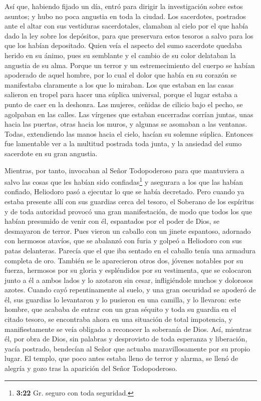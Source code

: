  Así que, habiendo fijado un día, entró para dirigir la
investigación sobre estos asuntos; y hubo no poca angustia en toda la
ciudad.  Los sacerdotes, postrados ante el altar con sus
vestiduras sacerdotales, clamaban al cielo por el que había dado la ley
sobre los depósitos, para que preservara estos tesoros a salvo para los
que los habían depositado.  Quien veía el aspecto del
sumo sacerdote quedaba herido en su ánimo, pues su semblante y el cambio
de su color delataban la angustia de su alma.  Porque un
terror y un estremecimiento del cuerpo se habían apoderado de aquel
hombre, por lo cual el dolor que había en su corazón se manifestaba
claramente a los que lo miraban.  Los que estaban en las
casas salieron en tropel para hacer una súplica universal, porque el
lugar estaba a punto de caer en la deshonra.  Las
mujeres, ceñidas de cilicio bajo el pecho, se agolpaban en las calles.
Las vírgenes que estaban encerradas corrían juntas, unas hacia las
puertas, otras hacia los muros, y algunas se asomaban a las ventanas.
 Todas, extendiendo las manos hacia el cielo, hacían su
solemne súplica.  Entonces fue lamentable ver a la
multitud postrada toda junta, y la ansiedad del sumo sacerdote en su
gran angustia.

 Mientras, por tanto, invocaban al Señor Todopoderoso
para que mantuviera a salvo las cosas que les habían sido
confiadas\footnote{\textbf{3:22} Gr. seguro con toda seguridad.} y
asegurara a los que las habían confiado,  Heliodoro pasó
a ejecutar lo que se había decretado.  Pero cuando ya
estaba presente allí con sus guardias cerca del tesoro, el Soberano de
los espíritus y de toda autoridad provocó una gran manifestación, de
modo que todos los que habían presumido de venir con él, espantados por
el poder de Dios, se desmayaron de terror.  Pues vieron
un caballo con un jinete espantoso, adornado con hermosos atavíos, que
se abalanzó con furia y golpeó a Heliodoro con sus patas delanteras.
Parecía que el que iba sentado en el caballo tenía una armadura completa
de oro.  También se le aparecieron otros dos, jóvenes
notables por su fuerza, hermosos por su gloria y espléndidos por su
vestimenta, que se colocaron junto a él a ambos lados y lo azotaron sin
cesar, infligiéndole muchos y dolorosos azotes.  Cuando
cayó repentinamente al suelo, y una gran oscuridad se apoderó de él, sus
guardias lo levantaron y lo pusieron en una camilla,  y
lo llevaron: este hombre, que acababa de entrar con un gran séquito y
toda su guardia en el citado tesoro, se encontraba ahora en una
situación de total impotencia, y manifiestamente se veía obligado a
reconocer la soberanía de Dios.  Así, mientras él, por
obra de Dios, sin palabras y desprovisto de toda esperanza y liberación,
yacía postrado,  bendecían al Señor que actuaba
maravillosamente por su propio lugar. El templo, que poco antes estaba
lleno de terror y alarma, se llenó de alegría y gozo tras la aparición
del Señor Todopoderoso.

